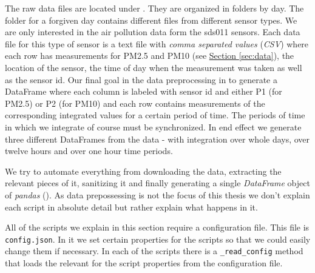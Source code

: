 \documentclass[12pt,a4paper,twoside]{scrartcl}
\numberwithin{equation}{section}
\newcommand{\refsec}[1]{\hyperref[#1]{Section \ref*{#1}}}
\begin{document}
The raw data files are located under \cite{datalink}. They are organized in folders by day. The folder for a forgiven day contains different files from different sensor types. We are only interested in the air pollution data form the sds011 sensors. Each data file for this type of sensor is a text file with \emph{comma separated values} (\emph{CSV}) where each row has measurements for PM2.5 and PM10 (see \refsec{sec:data}), the location of the sensor, the time of day when the measurement was taken as well as the sensor id. Our final goal in the data preprocessing in to generate a DataFrame where each column is labeled with sensor id and either P1 (for PM2.5) or P2 (for PM10) and each row contains measurements of the corresponding integrated values for a certain period of time. The periods of time in which we integrate of course must be synchronized. In end effect we generate three different DataFrames from the data - with integration over whole days, over twelve hours and over one hour time periods.

We try to automate everything from downloading the data, extracting the relevant pieces of it, sanitizing it and finally generating a single \emph{DataFrame} object of \emph{pandas} (\cite{pandas}). As data prepossessing is not the focus of this thesis we don't explain each script in absolute detail but rather explain what happens in it.

All of the scripts we explain in this section require a configuration file. This file is \texttt{config.json}. In it we set certain properties for the scripts so that we could easily change them if necessary. In each of the scripts there is a \texttt{\_read\_config} method that loads the relevant for the script properties from the configuration file.
\end{document}
